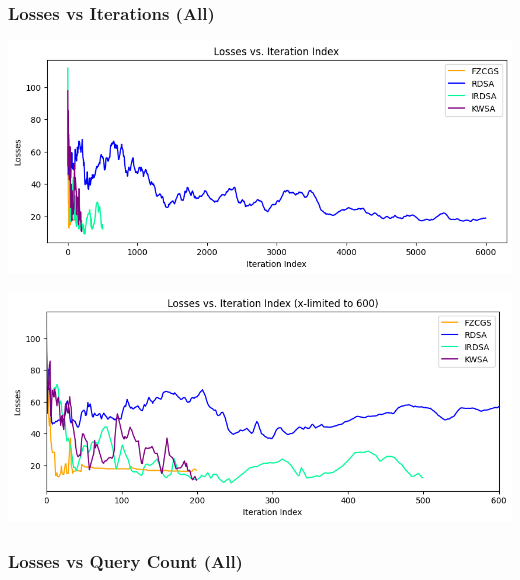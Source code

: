 \documentclass[10pt,twocolumn,letterpaper]{article}
\begin{document}
\subsubsection*{Losses vs Iterations (All)}

\begin{center}
   \includegraphics*[scale=0.35]{img/All_loss_vs_iterations.png}
\end{center}
\begin{center}
   \includegraphics*[scale=0.35]{img/xLimit_All_loss_vs_iterations.png}\\
\end{center} 

\subsubsection*{Losses vs Query Count (All)}
\end{document}
